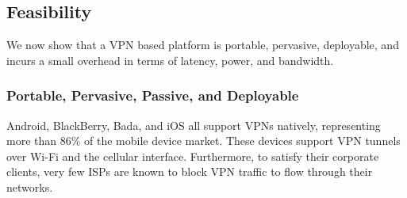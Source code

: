 

\subsection{Feasibility}

We now show that a VPN based platform is portable, pervasive, deployable, and incurs a small overhead in terms of latency, power, and bandwidth. 

\subsubsection{Portable, Pervasive, Passive, and Deployable} 
Android, BlackBerry, Bada, and iOS all support VPNs natively, representing more than 86\% of the mobile device market\cite{gartner-phone-share}. 
These devices support VPN tunnels over Wi-Fi and the cellular interface.
Furthermore, to satisfy their corporate clients, very few ISPs are known to block VPN traffic to flow through their networks.  

